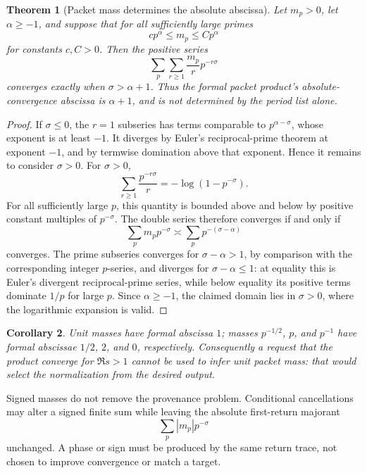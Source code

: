 \documentclass[11pt]{article}
\newtheorem{theorem}{Theorem}
\newtheorem{corollary}[theorem]{Corollary}
\theoremstyle{definition}
\theoremstyle{remark}
\begin{document}
\begin{theorem}[Packet mass determines the absolute abscissa]
\label{thm:abscissa}
Let \(m_p>0\), let \(\alpha\ge-1\), and suppose that for all sufficiently
large primes
\[
 c p^\alpha\le m_p\le C p^\alpha
\]
for constants \(c,C>0\).  Then the positive series
\[
 \sum_p\sum_{r\ge1}\frac{m_p}{r}p^{-r\sigma}
\]
converges exactly when \(\sigma>\alpha+1\).  Thus the formal packet product's
absolute-convergence abscissa is \(\alpha+1\), and is not determined by the
period list alone.
\end{theorem}

\begin{proof}
If \(\sigma\le0\), the \(r=1\) subseries has terms comparable to
\(p^{\alpha-\sigma}\), whose exponent is at least \(-1\).  It diverges by
Euler's reciprocal-prime theorem at exponent \(-1\), and by termwise
domination above that exponent.  Hence it remains to consider \(\sigma>0\).
For \(\sigma>0\),
\[
 \sum_{r\ge1}\frac{p^{-r\sigma}}{r}
 =-\log(1-p^{-\sigma}).
\]
For all sufficiently large \(p\), this quantity is bounded above and below by
positive constant multiples of \(p^{-\sigma}\).  The double series therefore
converges if and only if
\[
 \sum_p m_pp^{-\sigma}
 \asymp \sum_p p^{-(\sigma-\alpha)}
\]
converges.  The prime subseries converges for
\(\sigma-\alpha>1\), by comparison with the corresponding integer
\(p\)-series, and diverges for \(\sigma-\alpha\le1\): at equality this is
Euler's divergent reciprocal-prime series, while below equality its positive
terms dominate \(1/p\) for large \(p\).  Since \(\alpha\ge-1\), the claimed
domain lies in \(\sigma>0\), where the logarithmic expansion is valid.
\end{proof}

\begin{corollary}
Unit masses have formal abscissa \(1\); masses \(p^{-1/2}\), \(p\), and
\(p^{-1}\) have formal abscissae \(1/2\), \(2\), and \(0\), respectively.
Consequently a request that the product converge for \(\Re s>1\) cannot be
used to infer unit packet mass: that would select the normalization from the
desired output.
\end{corollary}

Signed masses do not remove the provenance problem.  Conditional
cancellations may alter a signed finite sum while leaving the absolute
first-return majorant
\[
 \sum_p |m_p|p^{-\sigma}
\]
unchanged.  A phase or sign must be produced by the same return trace, not
chosen to improve convergence or match a target.
\end{document}
